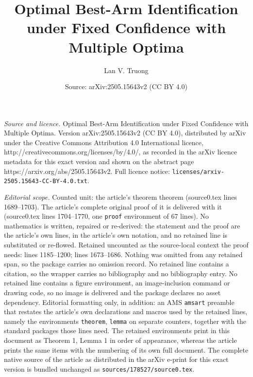 \documentclass[10pt,a4paper]{amsart}
\title{Optimal Best-Arm Identification under Fixed Confidence with Multiple Optima}
\author{Lan V. Truong}
\date{Source: arXiv:2505.15643v2 (CC BY 4.0)}
\begin{document}
\maketitle

\noindent\emph{Source and licence.} Optimal Best-Arm Identification under Fixed Confidence with Multiple Optima. Version arXiv:2505.15643v2 (CC BY 4.0), distributed by arXiv under the Creative Commons Attribution 4.0 International licence, http://creativecommons.org/licenses/by/4.0/, as recorded in the arXiv licence metadata for this exact version and shown on the abstract page https://arxiv.org/abs/2505.15643v2. Full licence notice: \texttt{licenses/arxiv-2505.15643-CC-BY-4.0.txt}.\par\smallskip

\noindent\textit{Editorial scope.} Counted unit: the article's theorem theorem (source0.tex lines 1689--1703). The article's complete original proof of it is delivered with it (source0.tex lines 1704--1770, one \texttt{proof} environment of 67 lines). No mathematics is written, repaired or re-derived: the statement and the proof are the article's own lines, in the article's own notation, and no retained line is substituted or re-flowed.  Retained uncounted as the source-local context the proof needs: lines 1185--1200; lines 1673--1686.  Nothing was omitted from any retained span, so the package carries no omission record.  No retained line contains a citation, so the wrapper carries no bibliography and no bibliography entry.  No retained line contains a figure environment, an image-inclusion command or drawing code, so no image is delivered and the package declares no asset dependency.  Editorial formatting only, in addition: an AMS \texttt{amsart} preamble that restates the article's own declarations and macros used by the retained lines, namely the environments \texttt{theorem}, \texttt{lemma} on separate counters, together with the standard packages those lines need.  The retained environments print in this document as Theorem 1, Lemma 1 in order of appearance, whereas the article prints the same items with the numbering of its own full document.  The complete native source of the article as distributed in the arXiv e-print for this exact version is bundled unchanged as \texttt{sources/178527/source0.tex}.
\end{document}
